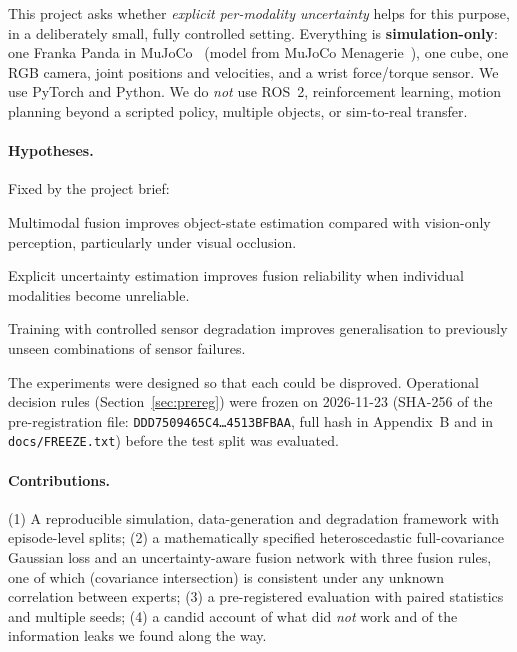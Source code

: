 \documentclass[11pt,a4paper]{article}
\newcommand{\simonly}{\textbf{simulation-only}}
\begin{document}
This project asks whether \emph{explicit per-modality uncertainty} helps for this purpose, in a deliberately small, fully controlled setting. Everything is \simonly: one Franka Panda in MuJoCo~\cite{todorov2012mujoco} (model from MuJoCo Menagerie~\cite{menagerie}), one cube, one RGB camera, joint positions and velocities, and a wrist force/torque sensor. We use PyTorch and Python. We do \emph{not} use ROS~2, reinforcement learning, motion planning beyond a scripted policy, multiple objects, or sim-to-real transfer.

\paragraph{Hypotheses.} Fixed by the project brief:
\begin{description}[leftmargin=2.2em,labelwidth=2em]
\item[H1] Multimodal fusion improves object-state estimation compared with vision-only perception, particularly under visual occlusion.
\item[H2] Explicit uncertainty estimation improves fusion reliability when individual modalities become unreliable.
\item[H3] Training with controlled sensor degradation improves generalisation to previously unseen combinations of sensor failures.
\end{description}
The experiments were designed so that each could be disproved. Operational decision rules (Section~\ref{sec:prereg}) were frozen on 2026-11-23 (SHA-256 of the pre-registration file: \texttt{DDD7509465C4\dots4513BFBAA}, full hash in Appendix~B and in \texttt{docs/FREEZE.txt}) before the test split was evaluated.

\paragraph{Contributions.}
(1) A reproducible simulation, data-generation and degradation framework with episode-level splits; (2) a mathematically specified heteroscedastic full-covariance Gaussian loss and an uncertainty-aware fusion network with three fusion rules, one of which (covariance intersection) is consistent under any unknown correlation between experts; (3) a pre-registered evaluation with paired statistics and multiple seeds; (4) a candid account of what did \emph{not} work and of the information leaks we found along the way.

\end{document}
